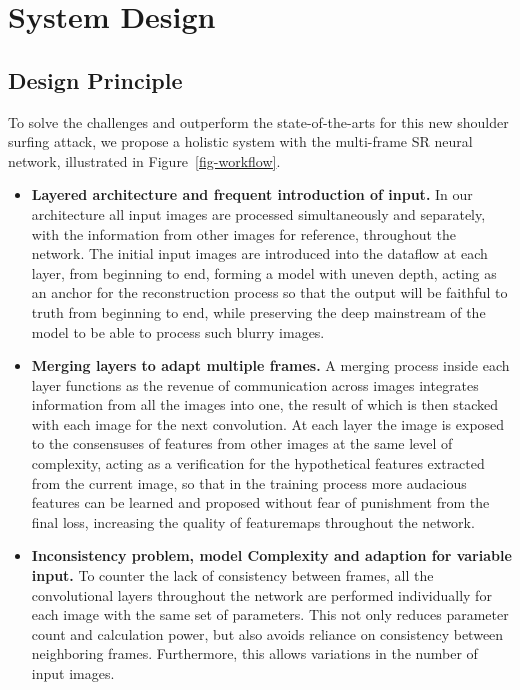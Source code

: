 \section{System Design}
\label{sec-design}

\subsection{Design Principle}
To solve the challenges and outperform the state-of-the-arts for this new shoulder surfing attack, we propose a holistic system with the multi-frame SR neural network, illustrated in Figure~\ref{fig-workflow}.

\begin{itemize}
    \item \textbf{Layered architecture and frequent introduction of input.} In our architecture all input images are processed simultaneously and separately, with the information from other images for reference, throughout the network. The initial input images are introduced into the dataflow at each layer, from beginning to end, forming a model with uneven depth, acting as an anchor for the reconstruction process so that the output will be faithful to truth from beginning to end, while preserving the deep mainstream of the model to be able to process such blurry images.
    \item \textbf{Merging layers to adapt multiple frames.} A merging process inside each layer functions as the revenue of communication across images integrates information from all the images into one, the result of which is then stacked with each image for the next convolution. At each layer the image is exposed to the consensuses of features from other images at the same level of complexity, acting as a verification for the hypothetical features extracted from the current image, so that in the training process more audacious features can be learned and proposed without fear of punishment from the final loss, increasing the quality of featuremaps throughout the network.
    \item \textbf{Inconsistency problem, model Complexity and adaption for variable input.} To counter the lack of consistency between frames, all the convolutional layers throughout the network are performed individually for each image with the same set of parameters. This not only reduces parameter count and calculation power, but also avoids reliance on consistency between neighboring frames. Furthermore, this allows variations in the number of input images.

\end{itemize}
